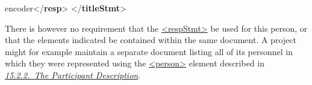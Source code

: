 \begin{shaded}
\hspace*{1em}encoder{</\textbf{resp}>}\mbox{}\newline 
{}\mbox{}\newline 
{</\textbf{titleStmt}>}\end{shaded}\egroup\par \noindent  There is however no requirement that the \hyperref[TEI.respStmt]{<respStmt>} be used for this person, or that the elements indicated be contained within the same document. A project might for example maintain a separate document listing all of its personnel in which they were represented using the \hyperref[TEI.person]{<person>} element described in \textit{\hyperref[CCAHPA]{15.2.2.\ The Participant Description}}.

